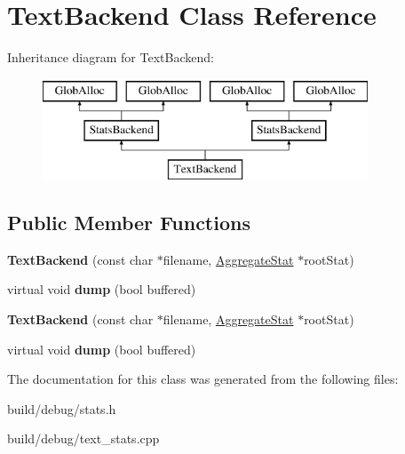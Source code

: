 \hypertarget{classTextBackend}{\section{Text\-Backend Class Reference}
\label{classTextBackend}
}
Inheritance diagram for Text\-Backend\-:\begin{figure}[H]
\begin{center}
\leavevmode
\includegraphics[height=3.000000cm]{classTextBackend}
\end{center}
\end{figure}
\subsection*{Public Member Functions}
\begin{DoxyCompactItemize}
\item 
\hypertarget{classTextBackend_ab3abc99bf4cf0bb76afdbc2fe62a08a0}{{\bfseries Text\-Backend} (const char $\ast$filename, \hyperlink{classAggregateStat}{Aggregate\-Stat} $\ast$root\-Stat)}\label{classTextBackend_ab3abc99bf4cf0bb76afdbc2fe62a08a0}

\item 
\hypertarget{classTextBackend_adade502fcdfdbbe77a3c7da81483e024}{virtual void {\bfseries dump} (bool buffered)}\label{classTextBackend_adade502fcdfdbbe77a3c7da81483e024}

\item 
\hypertarget{classTextBackend_ab3abc99bf4cf0bb76afdbc2fe62a08a0}{{\bfseries Text\-Backend} (const char $\ast$filename, \hyperlink{classAggregateStat}{Aggregate\-Stat} $\ast$root\-Stat)}\label{classTextBackend_ab3abc99bf4cf0bb76afdbc2fe62a08a0}

\item 
\hypertarget{classTextBackend_a39b2dff8865ff75852105f71e34c560c}{virtual void {\bfseries dump} (bool buffered)}\label{classTextBackend_a39b2dff8865ff75852105f71e34c560c}

\end{DoxyCompactItemize}


The documentation for this class was generated from the following files\-:\begin{DoxyCompactItemize}
\item 
build/debug/stats.\-h\item 
build/debug/text\-\_\-stats.\-cpp\end{DoxyCompactItemize}
